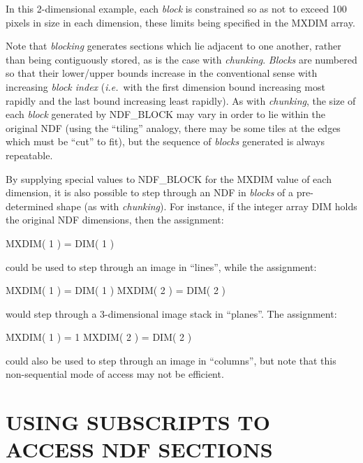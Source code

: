 \documentclass[twoside,11pt,nolof]{starlink}
\providecommand{\st}[1]{{\emph{#1}}}
\begin{document}
In this 2-dimensional example, each \st{block\/} is constrained so as not to
exceed 100 pixels in size in each dimension, these limits being specified in the
MXDIM array.

Note that \st{blocking\/} generates sections which lie adjacent to one another,
rather than being contiguously stored, as is the case with
\st{chunking}. \st{Blocks\/} are numbered so that their lower/upper
bounds increase in the
conventional sense with increasing \st{block index\/} (\st{i.e.}\ with the
first dimension bound increasing most rapidly and the last bound increasing
least rapidly). As with \st{chunking}, the size of each \st{block\/} generated
by NDF\_BLOCK may vary in order to lie within the original NDF (using the
``tiling'' analogy, there may be some tiles at the edges which must be ``cut''
to fit), but the sequence of \st{blocks\/} generated is always repeatable.

By supplying special values to NDF\_BLOCK for the MXDIM value of each
dimension, it is also possible to step through an NDF in \st{blocks\/}
of a pre-determined shape (as with \st{chunking\/}). For instance, if
the integer array DIM holds the original NDF dimensions, then the
assignment:

\small
\begin{terminalv}
      MXDIM( 1 ) = DIM( 1 )
\end{terminalv}
\normalsize

could be used to step through an image in ``lines'', while the
assignment:

\small
\begin{terminalv}
      MXDIM( 1 ) = DIM( 1 )
      MXDIM( 2 ) = DIM( 2 )
\end{terminalv}
\normalsize

would step through a 3-dimensional image stack in ``planes''. The assignment:

\small
\begin{terminalv}
      MXDIM( 1 ) = 1
      MXDIM( 2 ) = DIM( 2 )
\end{terminalv}
\normalsize

could also be used to step through an image in ``columns'', but note
that this non-sequential mode of access may not be efficient.


\section{\label{ss:sectionsbyname}USING SUBSCRIPTS TO ACCESS NDF SECTIONS}
\end{document}

